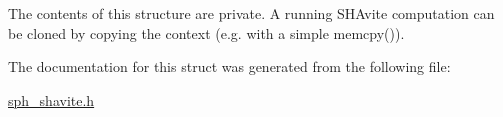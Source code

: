 The contents of this structure are private. A running S\+H\+Avite computation can be cloned by copying the context (e.\+g. with a simple {\ttfamily memcpy()}). 

The documentation for this struct was generated from the following file\+:\begin{DoxyCompactItemize}
\item 
\mbox{\hyperlink{sph__shavite_8h}{sph\+\_\+shavite.\+h}}\end{DoxyCompactItemize}
